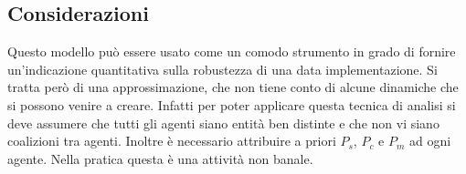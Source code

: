 \subsection{Considerazioni}
Questo modello può essere usato come un comodo strumento in grado di fornire
un'indicazione quantitativa sulla robustezza di una data implementazione.
Si tratta però di una approssimazione,
che non tiene conto di alcune dinamiche che si possono venire a creare. Infatti per poter
applicare questa tecnica di analisi si deve assumere che tutti gli agenti siano entità ben distinte
e che non vi siano coalizioni tra agenti. Inoltre è necessario attribuire a priori
$ P_s $, $ P_c $ e $ P_m $ ad ogni agente. Nella pratica questa è una attività non banale.










